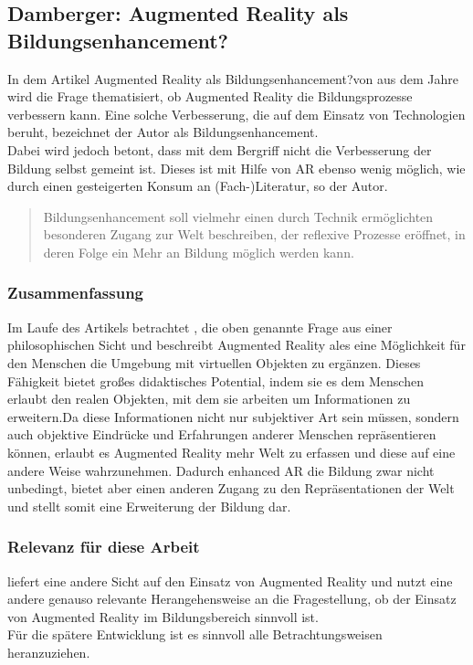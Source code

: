 \subsection{Damberger: Augmented Reality als Bildungsenhancement?}
In dem Artikel \glqq Augmented Reality als Bildungsenhancement?\grqq von \citeauthor{damberger:ar-bildungsenhancement} aus dem Jahre \citeyear{damberger:ar-bildungsenhancement} wird die Frage thematisiert, ob Augmented Reality die Bildungsprozesse verbessern kann. Eine solche Verbesserung, die auf dem Einsatz von Technologien beruht, bezeichnet der Autor als Bildungsenhancement. \\
Dabei wird jedoch betont, dass mit dem Bergriff nicht die Verbesserung der Bildung selbst gemeint ist. Dieses ist mit Hilfe von AR ebenso wenig möglich, wie durch einen gesteigerten Konsum an (Fach-)Literatur, so der Autor.
\begin{quote}
\glqq Bildungsenhancement soll vielmehr einen durch Technik ermöglichten besonderen Zugang zur Welt beschreiben, der reflexive Prozesse eröffnet, in deren Folge ein Mehr an Bildung möglich werden kann.\grqq \citep[S. 5]{damberger:ar-bildungsenhancement}
\end{quote}


\subsubsection{Zusammenfassung}
Im Laufe des Artikels betrachtet \citeauthor{damberger:ar-bildungsenhancement}, die oben genannte Frage aus einer philosophischen Sicht und beschreibt Augmented Reality ales eine Möglichkeit für den Menschen die Umgebung mit virtuellen Objekten zu ergänzen. Dieses Fähigkeit bietet großes didaktisches Potential, indem sie es dem Menschen erlaubt den realen Objekten, mit dem sie arbeiten um Informationen zu erweitern.Da diese Informationen nicht nur subjektiver Art sein müssen, sondern auch objektive Eindrücke und Erfahrungen anderer Menschen repräsentieren können, erlaubt es Augmented Reality mehr Welt zu erfassen und diese auf eine andere Weise wahrzunehmen. Dadurch \glqq enhanced\grqq{} AR die Bildung zwar nicht unbedingt, bietet aber einen anderen Zugang zu den Repräsentationen der Welt und stellt somit eine Erweiterung der Bildung dar. \citep[S. 22-23]{damberger:ar-bildungsenhancement}

\subsubsection{Relevanz für diese Arbeit}
\citeauthor{damberger:ar-bildungsenhancement} liefert eine andere Sicht auf den Einsatz von Augmented Reality und nutzt eine andere genauso relevante Herangehensweise an die Fragestellung, ob der Einsatz von Augmented Reality im Bildungsbereich sinnvoll ist.\\
Für die spätere Entwicklung ist es sinnvoll alle Betrachtungsweisen heranzuziehen.


